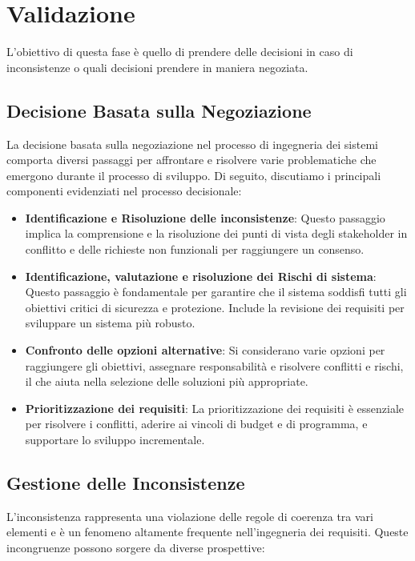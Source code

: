 \chapter{Validazione}
L'obiettivo di questa fase è quello di prendere delle decisioni in caso di inconsistenze o 
quali decisioni prendere in maniera negoziata.
\section{Decisione Basata sulla Negoziazione}

La decisione basata sulla negoziazione nel processo di ingegneria dei sistemi
comporta diversi passaggi per affrontare e risolvere varie problematiche che emergono
durante il processo di sviluppo. Di seguito, discutiamo i principali componenti
evidenziati nel processo decisionale:

\begin{itemize}
    \item \textbf{Identificazione e Risoluzione delle inconsistenze}: Questo passaggio
    implica la comprensione e la risoluzione dei punti di vista degli stakeholder in
    conflitto e delle richieste non funzionali per raggiungere un consenso.
    \item \textbf{Identificazione, valutazione e risoluzione dei Rischi di sistema}:
    Questo passaggio è fondamentale per garantire che il sistema soddisfi tutti gli
    obiettivi critici di sicurezza e protezione. Include la revisione dei requisiti
    per sviluppare un sistema più robusto.
    \item \textbf{Confronto delle opzioni alternative}: Si considerano varie opzioni
    per raggiungere gli obiettivi, assegnare responsabilità e risolvere conflitti e
    rischi, il che aiuta nella selezione delle soluzioni più appropriate.
    \item \textbf{Prioritizzazione dei requisiti}: La prioritizzazione dei requisiti
    è essenziale per risolvere i conflitti, aderire ai vincoli di budget e di programma,
    e supportare lo sviluppo incrementale.
\end{itemize}
\section{Gestione delle Inconsistenze}
L'inconsistenza rappresenta una violazione delle regole di coerenza tra vari
elementi e è un fenomeno altamente frequente nell'ingegneria dei requisiti.
Queste incongruenze possono sorgere da diverse prospettive:

